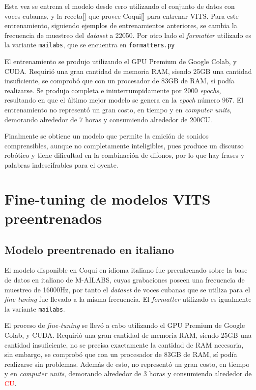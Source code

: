 Esta vez se entrena el modelo desde cero utilizando el conjunto de datos con voces cubanas, y la receta[\cite{train-vits}] que provee Coqui[\cite{coqui-doc}] para entrenar VITS. Para este entrenamiento, siguiendo ejemplos de entrenamientos anteriores, se cambia la frecuencia de muestreo del \textit{dataset} a 22050. Por otro lado el \textit{formatter} utilizado es la variante \texttt{mailabs}, que se encuentra en \texttt{formatters.py}

El entrenamiento se produjo utilizando el GPU Premium de Google Colab, y CUDA. Requirió una gran cantidad de memoria RAM, siendo 25GB una cantidad insuficiente, se comprobó que con un procesador de 83GB de RAM, sí podía realizarse. Se produjo completa e ininterrumpidamente por 2000 \textit{epochs}, resultando en que el último mejor modelo se genera en la \textit{epoch} número 967. El entrenamiento no representó un gran costo, en tiempo y en \textit{computer units}, demorando alrededor de 7 horas y consumiendo alrededor de 200CU.

Finalmente se obtiene un modelo que permite la emición de sonidos comprensibles, aunque no completamente inteligibles, pues produce un discurso robótico y tiene dificultad en la combinación de difonos, por lo que hay frases y palabras indescifrables para el oyente.



\section{Fine-tuning de modelos VITS preentrenados}

\subsection{Modelo preentrenado en italiano}
El modelo disponible en Coqui en idioma italiano fue preentrenado sobre la base de datos en italiano de M-AILABS, cuyas grabaciones poseen una frecuencia de muestreo de 16000Hz, por tanto el \textit{dataset} de voces cubanas que se utiliza para el \textit{fine-tuning} fue llevado a la misma frecuencia.
El \textit{formatter} utilizado es igualmente la variante \texttt{mailabs}.

El proceso de \textit{fine-tuning} se llevó a cabo utilizando el GPU Premium de Google Colab, y CUDA. Requirió una gran cantidad de memoria RAM, siendo 25GB una cantidad insuficiente, no se precisa exactamente la cantidad de RAM necesaria, sin embargo, se comprobó que con un procesador de 83GB de RAM, sí podía realizarse sin problemas. Además de esto, no representó un gran costo, en tiempo y en \textit{computer units}, demorando alrededor de 3 horas y consumiendo alrededor de \textcolor{red}{CU}.

